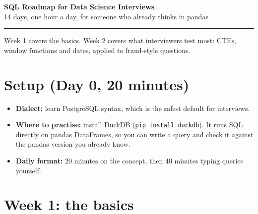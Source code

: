 \documentclass[11pt,a4paper]{article}
\newcommand{\code}[1]{\texttt{#1}}
\begin{document}
{\LARGE\bfseries\color{accent} SQL Roadmap for Data Science Interviews}\\[0.3em]
{\large 14 days, one hour a day, for someone who already thinks in pandas}\\[-0.4em]
{\color{rulegray}\rule{\textwidth}{0.6pt}}

Week 1 covers the basics. Week 2 covers what interviewers test most: CTEs,
window functions and dates, applied to fraud-style questions.

\section{Setup (Day 0, 20 minutes)}

\begin{itemize}
  \item \textbf{Dialect:} learn PostgreSQL syntax, which is the safest default for interviews.
  \item \textbf{Where to practise:} install DuckDB (\code{pip install duckdb}). It runs SQL
        directly on pandas DataFrames, so you can write a query and check it against the
        pandas version you already know.
  \item \textbf{Daily format:} 20 minutes on the concept, then 40 minutes typing queries yourself.
\end{itemize}

\section{Week 1: the basics}
\end{document}
